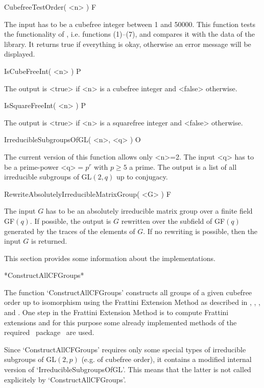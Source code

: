 \>CubefreeTestOrder( <n> ) F

The input has to be a cubefree integer between 1 and 50000. This function
tests the functionality of {\Cubefree}, i.e. functions (1)--(7), and compares it with the data
of the {\SmallGroups} library. It returns true if everything is okay,
otherwise an error message will be displayed.

\>IsCubeFreeInt( <n> ) P

The output is <true> if <n> is a cubefree integer and <false> otherwise.


\>IsSquareFreeInt( <n> ) P

The output is <true> if <n> is a squarefree integer and <false> otherwise.

\>IrreducibleSubgroupsOfGL( <n>, <q> ) O

The current version of this function allows only <n>=2. The input <q> has to be a prime-power <q>$=p^r$ with $p\geq 5$ a prime. The output
is a list of all irreducible subgroups of GL$(2,q)$ up to conjugacy.

\>RewriteAbsolutelyIrreducibleMatrixGroup( <G> ) F

The input $G$ has to be an absolutely irreducible matrix group over a finite
field GF$(q)$. If possible, the output is
$G$ rewritten over the subfield of GF$(q)$ generated by the traces of the
elements of $G$. If no rewriting is possible, then the
input $G$ is returned. 



This section provides some information about the implementations.


*ConstructAllCFGroups*

The function `ConstructAllCFGroups' constructs all groups of a given
cubefree order up to isomorphism using the Frattini Extension Method as described in \cite{Di05},
  \cite{DiEi05}, \cite{BeEia}, and \cite{BeEib}. One step in the Frattini
  Extension Method is to compute Frattini extensions 
  and for this purpose some already implemented
methods of the required \GAP ~package \GrpConst ~are used. 

Since `ConstructAllCFGroups' requires only
some special types of irreducible subgroups of GL$(2,p)$ (e.g. of cubefree order), it
contains a modified internal version of
`IrreducibleSubgroupsOfGL'. This means that the latter is not called explicitely by
`ConstructAllCFGroups'.

~

